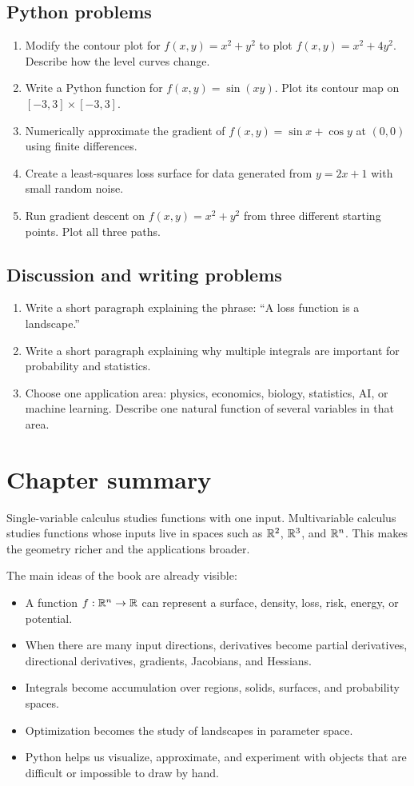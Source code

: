 \subsection*{Python problems}
\begin{enumerate}[resume]
  \item Modify the contour plot for $f(x,y)=x^2+y^2$ to plot $f(x,y)=x^2+4y^2$. Describe how the level curves change.
  \item Write a Python function for $f(x,y)=\sin(xy)$. Plot its contour map on $[-3,3]\times[-3,3]$.
  \item Numerically approximate the gradient of $f(x,y)=\sin x+\cos y$ at $(0,0)$ using finite differences.
  \item Create a least-squares loss surface for data generated from $y=2x+1$ with small random noise.
  \item Run gradient descent on $f(x,y)=x^2+y^2$ from three different starting points. Plot all three paths.
\end{enumerate}

\subsection*{Discussion and writing problems}
\begin{enumerate}[resume]
  \item Write a short paragraph explaining the phrase: ``A loss function is a landscape.''
  \item Write a short paragraph explaining why multiple integrals are important for probability and statistics.
  \item Choose one application area: physics, economics, biology, statistics, AI, or machine learning. Describe one natural function of several variables in that area.
\end{enumerate}

\section{Chapter summary}

Single-variable calculus studies functions with one input. Multivariable calculus studies functions whose inputs live in spaces such as $\mathbb{R}^2$, $\mathbb{R}^3$, and $\mathbb{R}^n$. This makes the geometry richer and the applications broader.

The main ideas of the book are already visible:
\begin{itemize}
  \item A function $f:\mathbb{R}^n\to\mathbb{R}$ can represent a surface, density, loss, risk, energy, or potential.
  \item When there are many input directions, derivatives become partial derivatives, directional derivatives, gradients, Jacobians, and Hessians.
  \item Integrals become accumulation over regions, solids, surfaces, and probability spaces.
  \item Optimization becomes the study of landscapes in parameter space.
  \item Python helps us visualize, approximate, and experiment with objects that are difficult or impossible to draw by hand.
\end{itemize}

